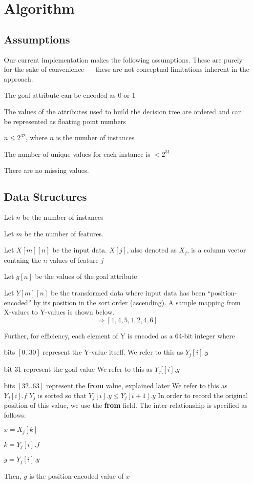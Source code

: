 \documentclass[12pt,letterpaper]{article}
\begin{document}
\section{Algorithm}
\subsection{Assumptions}
Our current implementation makes the following assumptions. These are purely for
the sake of convenience --- these are not conceptual limitations inherent in
the approach.

\be
\item The goal attribute can be encoded as 0 or 1
\item The values of the attributes used to build the decision tree are ordered and can be
  represented as floating point numbers
\item \(n \leq 2^{32}\), where \(n\) is the number of instances
\item The number of unique values for each instance is \(< 2^{31}\)
\item There are no missing values. 
\ee

\subsection{Data Structures}

\be
\item Let \(n\) be the number of instances
\item Let \(m\) be the number of features. 
\item Let \(X[m][n]\) be the input data. \(X[j]\), also denoted as \(X_j\),  is a column vector containg
  the \(n\) values of feature \(j\)
\item Let \(g[n]\) be the values of the goal attribute
\item Let \(Y[m][n]\) be the transformed data where input data has been
  ``position-encoded'' 
  by its position in the sort order (ascending). A sample mapping from 
  X-values to Y-values is shown below.
\begin{displaymath}
[11, 32, 47, 11, 17, 28, 32, 55] \Rightarrow [1, 4, 5, 1, 2, 4, 6]
\end{displaymath}

Further, for efficiency, each element of Y is encoded as a 64-bit integer where 
\bi
\item bits \([0..30]\) represent the Y-value itself. 
  We refer to this as \(Y_j[i].y\)
\item bit 31 represent the goal value
  We refer to this as \(Y_j[[i].g\)
\item bits \([32..63]\) represent the {\bf from} value, explained later
  We refer to this as \(Y_j[i].f\)
  \ei
\(Y_j\) is sorted so that \(Y_j[i].y \leq Y_j[i+1].y\)
In order to record the original position of this value, we use the {\bf from}
field. The inter-relationship is specified as follows:
\bi
\item \(x = X_j[k]\)
\item \(k = Y_j[i].f\)
\item \(y = Y_j[i].y\)
\item Then, \(y\) is the position-encoded value of \(x\)
  \ei
\end{document}
